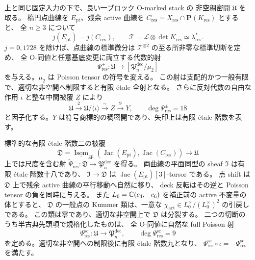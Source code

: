 \begin{maintheorem}
上と同じ固定入力の下で、良い一ブロック O-marked stack の
非空稠密開 $\mathfrak U$ を取る。
楕円点曲線を $E_{\mathrm{pt}}$、残余 active 曲線を
$C_{\mathrm{res}}=X_{\mathrm{res}}\cap\mathbf P(K_{\mathrm{res}})$ とすると、
全 $n\ge3$ について
\[
 j(E_{\mathrm{pt}})=j(C_{\mathrm{res}}),\qquad
 \mathscr T=\mathcal L\otimes\det K_{\mathrm{res}}
     \simeq\lambda_{\mathrm{res}}^*.
\]
$j=0,1728$ を除けば、点曲線の標準微分は
$\mathscr T^{\otimes2}$ の至る所非零な標準切断を定め、
全 O-同値と任意基底変更に両立する代数的射
\[
 \Psi_{\mathrm{res}}^\pm:\mathfrak U
    \longrightarrow[\mathfrak P_n^{\mathrm{dec}}/\mu_2]
\]
を与える。$\mu_2$ は Poisson tensor の符号を変える。
この射は支配的かつ一般有限で、適切な非空開へ制限すると有限 étale 全射となる。
さらに反対代数の自由な作用 $\iota$ と整な中間被覆 $Z$ により
\[
 \mathfrak U\xrightarrow{\ 2\ }\mathfrak U/\langle\iota\rangle
       \xrightarrow{\ \sim\ }Z\xrightarrow{\ 9\ }Y,
 \qquad \deg\Psi_{\mathrm{res}}^\pm=18
\]
と因子化する。$Y$ は符号商標的の稠密開であり、矢印上は有限 étale 階数を表す。

標準的な有限 étale 階数二の被覆
\[
 \mathfrak D=
 \underline{\operatorname{Isom}}_{\mathrm{gp}}
 (\operatorname{Jac}(E_{\mathrm{pt}}),\operatorname{Jac}(C_{\mathrm{res}}))
 \longrightarrow\mathfrak U
\]
上では尺度を含む射
$\widetilde\Psi_{\mathrm{res}}:\mathfrak D\to\mathfrak P_n^{\mathrm{dec}}$ を得る。
両曲線の平面同型の sheaf $\mathfrak I$ は有限 étale 階数十八であり、
$\mathfrak I\to\mathfrak D$ は $\operatorname{Jac}(E_{\mathrm{pt}})[3]$-torsor である。
点 shift は $\mathfrak D$ 上で残余 active 曲線の平行移動へ自然に移り、
deck 反転はその逆と Poisson tensor の負を同時に与える。
また $L_0=\mathbb C(c_4,-c_6)$ を補正前の active 不変量の体とすると、
$\mathfrak D$ の一般点の Kummer 類は、一意な
$\chi_{\mathrm{act}}\in L_0^\times/(L_0^\times)^2$ の引戻しである。
この類は零であり、適切な非空開上で $\mathfrak D$ は分裂する。
二つの切断のうち半古典先頭項で規格化したものは、
全 O-同値に自然な full Poisson 射
\[
 \Psi_{\mathrm{res}}^{\mathrm{sc}}:
 \mathfrak U\longrightarrow\mathfrak P_n^{\mathrm{dec}},
 \qquad\deg\Psi_{\mathrm{res}}^{\mathrm{sc}}=9
\]
を定める。適切な非空開への制限後に有限 \'etale 階数九となり、
$\Psi_{\mathrm{res}}^{\mathrm{sc}}\circ\iota
 =-\Psi_{\mathrm{res}}^{\mathrm{sc}}$ を満たす。
\end{maintheorem}

